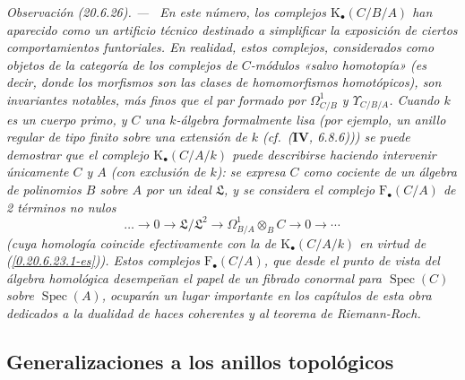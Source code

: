 \documentclass[10pt,oneside]{book}
\makeatletter
\newcommand{\sref}[1]{\textup{(\ref{#1})}}
\newcommand{\setmanualcurrentlabel}[1]{\def\@currentlabel{#1}}
\newcommand{\oldpage}[2][]{%
  \setcounter{footnote}{0}%
  \marginpar{\scriptsize\textbf{#1}~|~#2}\ignorespaces}
\newenvironment{remark}[1][]{%
  \setmanualcurrentlabel{#1}\par\medskip\noindent\itshape Observación (#1). ---\ }{\par}
\makeatother
\begin{document}
\begin{remark}[20.6.26]
\label{0.20.6.26-es}
En este número, los complejos $\mathrm{K}_\bullet(C/B/A)$ han aparecido como
un artificio técnico destinado a simplificar la exposición de ciertos
comportamientos funtoriales. En realidad, estos complejos, considerados como objetos
de la categoría de los
\oldpage[0\textsubscript{IV-1}]{147}
complejos de $C$-módulos «salvo homotopía» (es decir, donde los morfismos
son las clases de homomorfismos homotópicos), son invariantes notables,
más finos que el par formado por $\Omega^1_{C/B}$ y
$\Upsilon_{C/B/A}$. Cuando $k$ es un cuerpo primo, y $C$ una $k$-álgebra
formalmente lisa (por ejemplo, un anillo regular de tipo finito sobre una
extensión de $k$ (cf.\ ($\mathbf{IV}$, 6.8.6))) se puede demostrar que el
complejo $\mathrm{K}_\bullet(C/A/k)$ puede describirse haciendo intervenir
únicamente $C$ y $A$ (con exclusión de $k$): se expresa $C$ como cociente
de un álgebra de polinomios $B$ sobre $A$ por un ideal $\mathfrak L$, y se
considera el complejo $\mathrm{F}_\bullet(C/A)$ de 2 términos no nulos
\[
  \ldots\to0\to\mathfrak L/\mathfrak L^2\to
  \Omega^1_{B/A}\otimes_B C\to0\to\cdots
\]
(cuya homología coincide efectivamente con la de
$\mathrm{K}_\bullet(C/A/k)$ en virtud de \sref{0.20.6.23.1-es}). Estos
complejos $\mathrm{F}_\bullet(C/A)$, que desde el punto de vista del álgebra
homológica desempeñan el papel de un fibrado conormal para $\operatorname{Spec}(C)$
sobre $\operatorname{Spec}(A)$, ocuparán un lugar importante en
los capítulos de esta obra dedicados a la dualidad de haces coherentes y
al teorema de Riemann-Roch.
\end{remark}

\subsection{Generalizaciones a los anillos topológicos}
\label{subsection:0.20.7-es}
\end{document}
